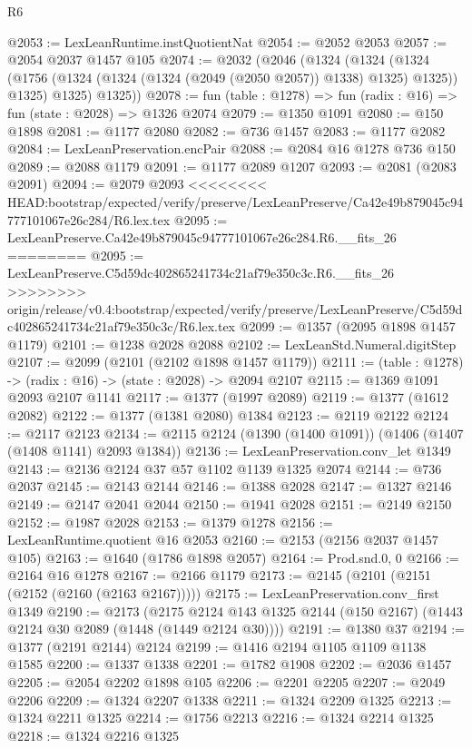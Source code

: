 \begin{lexlean}{R6}
\begin{coremodule}
{{{{{{{{{{{{{{{{{{{{{{{{{{{{{{{{{{{{{{{{{{{{{{{{{{@2053 := LexLeanRuntime.instQuotientNat
@2054 := @2052 @2053
@2057 := @2054 @2037 @1457 @105
@2074 := @2032
    (@2046
      (@1324
        (@1324
          (@1324 (@1756 (@1324 (@1324 (@1324 (@2049 (@2050 @2057)) @1338) @1325) @1325)) @1325)
          @1325)
        @1325))
@2078 := fun (table : @1278) => fun (radix : @16) => fun (state : @2028) => @1326 @2074
@2079 := @1350 @1091
@2080 := @150 @1898
@2081 := @1177 @2080
@2082 := @736 @1457
@2083 := @1177 @2082
@2084 := LexLeanPreservation.encPair
@2088 := @2084 @16 @1278 @736 @150
@2089 := @2088 @1179
@2091 := @1177 @2089 @1207
@2093 := @2081 (@2083 @2091)
@2094 := @2079 @2093
<<<<<<<< HEAD:bootstrap/expected/verify/preserve/LexLeanPreserve/Ca42e49b879045c94777101067e26c284/R6.lex.tex
@2095 := LexLeanPreserve.Ca42e49b879045c94777101067e26c284.R6.__fits_26
========
@2095 := LexLeanPreserve.C5d59dc402865241734c21af79e350c3c.R6.__fits_26
>>>>>>>> origin/release/v0.4:bootstrap/expected/verify/preserve/LexLeanPreserve/C5d59dc402865241734c21af79e350c3c/R6.lex.tex
@2099 := @1357 (@2095 @1898 @1457 @1179)
@2101 := @1238 @2028 @2088
@2102 := LexLeanStd.Numeral.digitStep
@2107 := @2099 (@2101 (@2102 @1898 @1457 @1179))
@2111 := (table : @1278) -> (radix : @16) -> (state : @2028) -> @2094 @2107
@2115 := @1369 @1091 @2093 @2107 @1141
@2117 := @1377 (@1997 @2089)
@2119 := @1377 (@1612 @2082)
@2122 := @1377 (@1381 @2080) @1384
@2123 := @2119 @2122
@2124 := @2117 @2123
@2134 := @2115 @2124 (@1390 (@1400 @1091)) (@1406 (@1407 (@1408 @1141) @2093 @1384))
@2136 := LexLeanPreservation.conv_let @1349
@2143 := @2136 @2124 @37 @57 @1102 @1139 @1325 @2074
@2144 := @736 @2037
@2145 := @2143 @2144
@2146 := @1388 @2028
@2147 := @1327 @2146
@2149 := @2147 @2041 @2044
@2150 := @1941 @2028
@2151 := @2149 @2150
@2152 := @1987 @2028
@2153 := @1379 @1278
@2156 := LexLeanRuntime.quotient @16 @2053
@2160 := @2153 (@2156 @2037 @1457 @105)
@2163 := @1640 (@1786 @1898 @2057)
@2164 := Prod.snd.{0, 0}
@2166 := @2164 @16 @1278
@2167 := @2166 @1179
@2173 := @2145 (@2101 (@2151 (@2152 (@2160 (@2163 @2167)))))
@2175 := LexLeanPreservation.conv_first @1349
@2190 := @2173
    (@2175 @2124 @143 @1325 @2144 (@150 @2167) (@1443 @2124 @30 @2089 (@1448 (@1449 @2124 @30))))
@2191 := @1380 @37
@2194 := @1377 (@2191 @2144) @2124
@2199 := @1416 @2194 @1105 @1109 @1138 @1585
@2200 := @1337 @1338
@2201 := @1782 @1908
@2202 := @2036 @1457
@2205 := @2054 @2202 @1898 @105
@2206 := @2201 @2205
@2207 := @2049 @2206
@2209 := @1324 @2207 @1338
@2211 := @1324 @2209 @1325
@2213 := @1324 @2211 @1325
@2214 := @1756 @2213
@2216 := @1324 @2214 @1325
@2218 := @1324 @2216 @1325
}}}}}}}}}}}}}}}}}}}}}}}}}}}}}}}}}}}}}}}}}}}}}}}}}}
\end{coremodule}
\end{lexlean}
